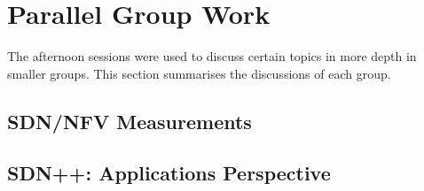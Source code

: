 \section{Parallel Group Work}\label{sec:parallel-group-work}

The afternoon sessions were used to discuss certain topics in more depth in
smaller groups. This section summarises the discussions of each group.

\subsection{SDN/NFV Measurements}

\subsection{SDN++: Applications Perspective}

